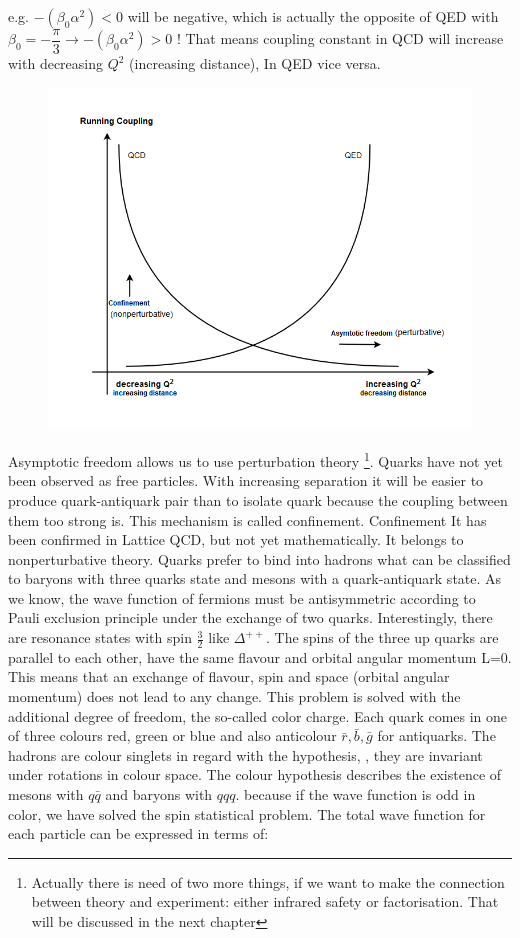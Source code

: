 e.g. $ -(\beta_0 \alpha^2) <0 $ will be negative, which is actually the opposite of QED with $ \beta_0=- \dfrac{\pi}{3} \rightarrow -(\beta_0 \alpha^2) >0 $ ! That means coupling constant in QCD will increase
with decreasing $ Q^2 $ (increasing distance), In QED vice versa.
\begin{figure}[h!]
\centering
\includegraphics[scale=0.7]{images/Intro/QCDRunningCoupling.png}
\end{figure}



Asymptotic freedom allows us to use perturbation theory \footnote{Actually there is need of two more things, if we want to make the connection between theory and experiment: either infrared safety or factorisation. That will be discussed in the next chapter}.
Quarks have not yet been observed as free particles. With increasing separation it will be easier to produce quark-antiquark pair than to isolate quark because the coupling between them too strong is. This mechanism is called confinement. Confinement It has been confirmed in Lattice QCD, but not yet mathematically. It belongs to  nonperturbative theory.
Quarks prefer to bind into hadrons what can be classified to baryons with three quarks state and mesons with a quark-antiquark state.
As we know, the wave function of fermions must be antisymmetric according to Pauli exclusion principle under the exchange of two quarks. Interestingly, there are resonance states with spin $ \frac{3}{2} $ like $ {\Delta}^{++} $.
The spins of the three up quarks are parallel to each other, have the same flavour and orbital angular momentum L=0. This means that an exchange of flavour, spin and space (orbital angular momentum) does not lead to any change. This problem is solved with the additional degree of freedom, the so-called color charge. Each quark comes in one of three colours red, green or blue and also anticolour $ \bar{r}, \bar{b}, \bar{g} $ for antiquarks. The hadrons are colour singlets in regard with the hypothesis,
, they are invariant under rotations in colour space. The colour hypothesis describes the existence of mesons with $ q \bar{q} $ and baryons with $ qqq $. because if the wave function is odd in color, we have solved the spin statistical problem.
The total wave function for each particle can be expressed in terms of:


